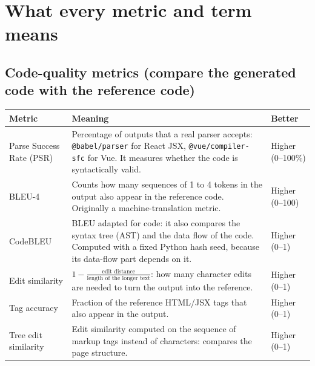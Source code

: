 \documentclass[11pt,a4paper]{article}
\begin{document}
\section{What every metric and term means}

\subsection*{Code-quality metrics (compare the generated code with the reference code)}
\renewcommand{\arraystretch}{1.25}
\begin{tabularx}{\linewidth}{@{}p{3.1cm}X p{2.3cm}@{}}
\toprule
\textbf{Metric} & \textbf{Meaning} & \textbf{Better} \\
\midrule
Parse Success Rate (PSR) & Percentage of outputs that a real parser accepts: \texttt{@babel/parser} for React JSX,
\texttt{@vue/compiler-sfc} for Vue. It measures whether the code is syntactically valid. & Higher (0--100\%) \\
BLEU-4 & Counts how many sequences of 1 to 4 tokens in the output also appear in the reference code. Originally a
machine-translation metric. & Higher (0--100) \\
CodeBLEU & BLEU adapted for code: it also compares the syntax tree (AST) and the data flow of the code. Computed with a
fixed Python hash seed, because its data-flow part depends on it. & Higher (0--1) \\
Edit similarity & $1 - \frac{\text{edit distance}}{\text{length of the longer text}}$: how many character edits are
needed to turn the output into the reference. & Higher (0--1) \\
Tag accuracy & Fraction of the reference HTML/JSX tags that also appear in the output. & Higher (0--1) \\
Tree edit similarity & Edit similarity computed on the sequence of markup tags instead of characters: compares the
page structure. & Higher (0--1) \\
\bottomrule
\end{tabularx}
\end{document}
